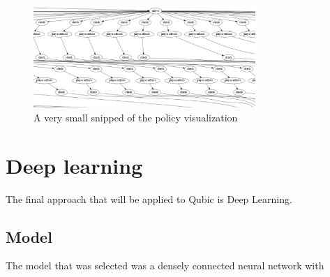 \documentclass[11pt]{article}
\begin{document}
\begin{figure}[h]
    \centering
    \includegraphics[width=0.75\textwidth]{policyviz}
    \caption{A very small snipped of the policy visualization}
    \label{fig:policyviz}
\end{figure}

\section{Deep learning}
The final approach that will be applied to Qubic is Deep Learning.

\subsection{Model}
The model that was selected was a densely connected neural network with 
\end{document}
